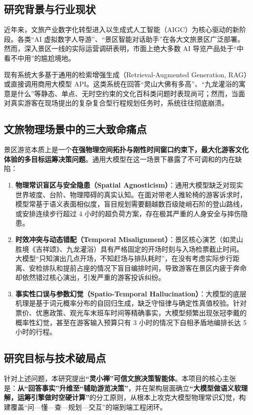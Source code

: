 \documentclass[11pt,a4paper]{ctexart}
\begin{document}
\subsection{研究背景与行业现状}
近年来，文旅产业数字化转型进入以生成式人工智能（AIGC）为核心驱动的新阶段。各类“AI 虚拟数字人导游”、“景区智能对话助手”在各大文旅景区广泛部署。然而，深入景区一线的实际运营调研表明，市面上绝大多数 AI 导览产品处于“中看不中用”的尴尬境地。

现有系统大多基于通用的检索增强生成（Retrieval-Augmented Generation, RAG）或直接调用商用大模型 API。这类系统在回答“灵山大佛有多高”、“九龙灌浴的寓意是什么”等静态、单点、无时空约束的文化百科类问题时表现尚可；然而，当面对真实游客在现场提出的复杂复合型行程规划任务时，系统往往彻底崩溃。

\subsection{文旅物理场景中的三大致命痛点}
景区游览本质上是一个\textbf{在强物理空间拓扑与刚性时间窗口约束下，最大化游客文化体验的多目标运筹决策问题}。通用大模型在这一场景下暴露了不可调和的内在缺陷：

\begin{enumerate}[label=\textbf{\arabic*.}]
    \item \textbf{物理常识盲区与安全隐患（Spatial Agnosticism）}：通用大模型缺乏对现实世界坡度、台阶、物理障碍的真实认知。在面对带老人推轮椅的游客诉求时，模型常基于语义表面相似度，盲目规划需要翻越数百级陡峭石阶的登山路线，或安排连续步行超过 4 小时的超负荷方案，存在极其严重的人身安全与摔伤隐患。
    \item \textbf{时效冲突与动态错配（Temporal Misalignment）}：景区核心演艺（如灵山胜境《吉祥颂》、九龙灌浴）具有严格固定的开场时刻与入场检票截止时间。大模型“只知演出几点开场，不知赶场与排队耗时”，在没有考虑实际步行距离、安检排队和提前占座的情况下盲目编排时间，导致游客在景区内疲于奔命却依然错过核心演出，引发严重的游客投诉纠纷。
    \item \textbf{事实性口误与参数幻觉（Spatio-Temporal Hallucination）}：大模型的底层机理是基于词元概率分布的自回归生成，缺乏守恒律与确定性真值校验。针对票价、优惠政策、观光车末班车时间等精确事实，大模型频繁出现张冠李戴的概率性幻觉，甚至在游客输入预算只有 3 小时的情况下自相矛盾地编排长达 5 小时的行程。
\end{enumerate}

\subsection{研究目标与技术破局点}
针对上述问题，本研究提出\textbf{“灵小禅”可信文旅决策智能体}。本项目的核心主张是：\textbf{从“回答事实”升维至“辅助游览决策”}，并在架构层面确立\textbf{“大模型做语义软理解，运筹引擎做时空硬计算”}的分工原则，从根本上攻克大模型物理常识幻觉，构建覆盖“问—懂—查—规划—交互”的端到端工程闭环。
\end{document}
